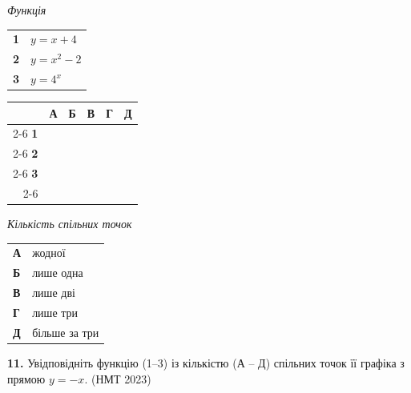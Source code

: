 \documentclass[14pt]{extarticle}
\newcommand{\nmtyear}[1]{\hfill{\small\color{yearcolor}(НМТ #1)}}
\begin{document}
\noindent
\begin{minipage}[t]{0.45\textwidth}
    \textit{Функція} \par \vspace{0.2cm}
    \begin{tabular}{@{}p{0.5cm} p{5cm}@{}}
    \textbf{1} & $y=x+4$ \\[0.3cm]
    \textbf{2} & $y=x^2-2$ \\[0.3cm]
    \textbf{3} & $y=4^x$ \\
    \end{tabular}
    
    \vspace{0.5cm}
    
    \begingroup
    \setlength{\tabcolsep}{4pt}
    \renewcommand{\arraystretch}{1.2}
    \small
    \begin{tabular}{r|c|c|c|c|c|}
         \multicolumn{1}{c}{} & \multicolumn{1}{c}{\textbf{А}} & \multicolumn{1}{c}{\textbf{Б}} & \multicolumn{1}{c}{\textbf{В}} & \multicolumn{1}{c}{\textbf{Г}} & \multicolumn{1}{c}{\textbf{Д}} \\ \cline{2-6}
         \textbf{1} & & & & & \\ \cline{2-6}
         \textbf{2} & & & & & \\ \cline{2-6}
         \textbf{3} & & & & & \\ \cline{2-6}
    \end{tabular}
    \endgroup
\end{minipage}%
\hfill
\begin{minipage}[t]{0.50\textwidth}
    \textit{Кількість спільних точок} \par \vspace{0.2cm}
    \begin{tabular}{@{}p{0.5cm} p{7.5cm}@{}}
    \textbf{А} & жодної \\[0.3cm]
    \textbf{Б} & лише одна \\[0.3cm]
    \textbf{В} & лише дві \\[0.3cm]
    \textbf{Г} & лише три \\[0.3cm]
    \textbf{Д} & більше за три \\
    \end{tabular}
\end{minipage}

\vspace{0.7cm}

\noindent\textbf{11.} Увідповідніть функцію (1–3) із кількістю (А – Д) спільних точок її графіка з прямою $y=-x$. \nmtyear{2023}
\end{document}
